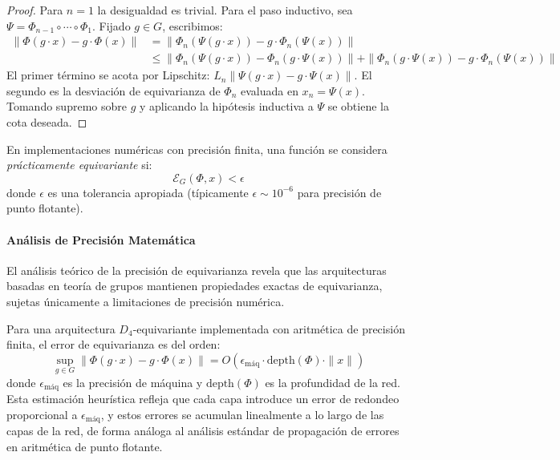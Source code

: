 \begin{proof}
Para $n = 1$ la desigualdad es trivial. Para el paso inductivo, sea $\Psi = \Phi_{n-1} \circ \cdots \circ \Phi_1$. Fijado $g \in G$, escribimos:
\begin{align}
\|\Phi(g \cdot x) - g \cdot \Phi(x)\| &= \|\Phi_n(\Psi(g \cdot x)) - g \cdot \Phi_n(\Psi(x))\| \\
&\leq \|\Phi_n(\Psi(g \cdot x)) - \Phi_n(g \cdot \Psi(x))\| + \|\Phi_n(g \cdot \Psi(x)) - g \cdot \Phi_n(\Psi(x))\|
\end{align}
El primer término se acota por Lipschitz: $L_n \|\Psi(g \cdot x) - g \cdot \Psi(x)\|$. El segundo es la desviación de equivarianza de $\Phi_n$ evaluada en $x_n = \Psi(x)$. Tomando supremo sobre $g$ y aplicando la hipótesis inductiva a $\Psi$ se obtiene la cota deseada.
\end{proof}

\begin{definition}\label{cor:tolerancia_error}
En implementaciones numéricas con precisión finita, una función se considera \textit{prácticamente equivariante} si:
\begin{equation}
\mathcal{E}_G(\Phi, x) < \epsilon
\end{equation}
donde $\epsilon$ es una tolerancia apropiada (típicamente $\epsilon \sim 10^{-6}$ para precisión de punto flotante).
\end{definition}

\paragraph{Análisis de Precisión Matemática}

El análisis teórico de la precisión de equivarianza revela que las arquitecturas basadas en teoría de grupos mantienen propiedades exactas de equivarianza, sujetas únicamente a limitaciones de precisión numérica.

\begin{remark}\label{rem:estabilidad_numerica}
Para una arquitectura $D_4$-equivariante implementada con aritmética de precisión finita, el error de equivarianza es del orden:
\begin{equation}
\sup_{g \in G}\|\Phi(g \cdot x) - g \cdot \Phi(x)\| = O\!\left(\epsilon_{\text{máq}} \cdot \text{depth}(\Phi) \cdot \|x\|\right)
\end{equation}
donde $\epsilon_{\text{máq}}$ es la precisión de máquina y $\text{depth}(\Phi)$ es la profundidad de la red. Esta estimación heurística refleja que cada capa introduce un error de redondeo proporcional a $\epsilon_{\text{máq}}$, y estos errores se acumulan linealmente a lo largo de las capas de la red, de forma análoga al análisis estándar de propagación de errores en aritmética de punto flotante.
\end{remark}


